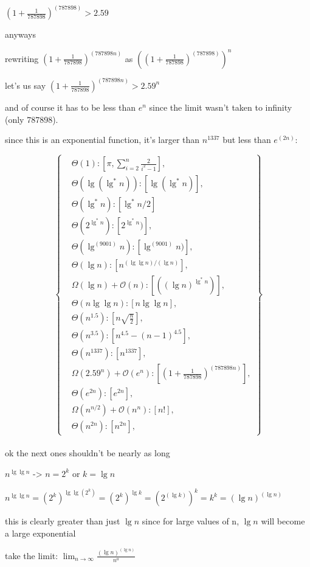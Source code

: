 \documentclass[11pt,fleqn]{article}
\theoremstyle{definition}
\theoremstyle{remark}
\begin{document}
${(1 + \frac{1}{787898})}^{(787898)} > 2.59$

anyways

rewriting ${(1 + \frac{1}{787898})}^{(787898n)}$ as $\left({{(1 + \frac{1}{787898})}^{(787898)}}\right)^n$

let's us say ${(1 + \frac{1}{787898})}^{(787898n)} > 2.59^n$

and of course it has to be less than $e^n$ since the limit wasn't taken to infinity (only 787898).

since this is an exponential function, it's larger than $n^{1337}$ but less than $e^{(2n)}$:


\[
\left\{
\begin{aligned}
& \Theta(1): [\pi, \sum_{i=2}^{n} \frac{2}{i^2 - 1}],\\
& \Theta(\lg(\lg^*n)): [\lg(\lg^*n)],\\
& \Theta(\lg^* n): [\lg^* n/2]\\
& \Theta(2^{\lg^*n}): [2^{\lg^*n})],\\
& \Theta(\lg^{(9001)} n): [\lg^{(9001)} n)],\\
& \Theta(\lg n): [n^{({\lg \lg n})/({\lg n})}],\\
& \Omega(\lg n) + \mathcal{O}(n): [({(\lg n)}^{\lg^*{n}})],\\
& \Theta(n\lg \lg n): [n\lg \lg n],\\
& \Theta(n^{1.5}): [n\sqrt{\frac{n}{2}}],\\
& \Theta(n^{3.5}): [n^{4.5} - (n - 1)^{4.5}],\\ 
& \Theta(n^{1337}): [n^{1337}],\\
& \Omega(2.59^n) + \mathcal{O}(e^n): [{(1 + \frac{1}{787898})}^{(787898n)}],\\
& \Theta(e^{2n}): [e^{2n}],\\
& \Omega(n^{n/2}) + \mathcal{O}(n^n): [n!],\\
& \Theta(n^{2n}): [n^{2n}],
\end{aligned}
\right\}
\]\\

ok the next ones shouldn't be nearly as long

$n^{\lg \lg n}$ -> $n = 2^k$ or $k = \lg n$

$n^{\lg \lg n} = {({2}^k)}^{\lg \lg {({2}^k)}} = {({2}^k)}^{\lg k} = {({2}^{(\lg k)})}^{k} = k^k = {(\lg n)}^{(\lg n)}$

this is clearly greater than just $\lg n$ since for large values of n, $\lg n$ will become a large exponential

take the limit: $\lim_{n \to \infty} \frac{{{(\lg n)}^{(\lg n)}}}{n^a}$
\end{document}
